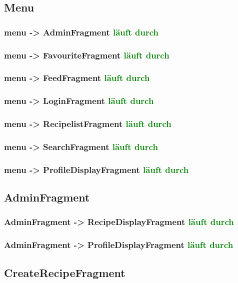 \subsection{Menu}
\subsubsection{menu -> AdminFragment \textcolor{green}{läuft durch}}
\subsubsection{menu -> FavouriteFragment \textcolor{green}{läuft durch}}
\subsubsection{menu -> FeedFragment \textcolor{green}{läuft durch}}
\subsubsection{menu -> LoginFragment \textcolor{green}{läuft durch}}
\subsubsection{menu -> RecipelistFragment \textcolor{green}{läuft durch}}
\subsubsection{menu -> SearchFragment \textcolor{green}{läuft durch}}
\subsubsection{menu -> ProfileDisplayFragment \textcolor{green}{läuft durch}}

\subsection{AdminFragment}
\subsubsection{AdminFragment -> RecipeDisplayFragment \textcolor{green}{läuft durch}}
\subsubsection{AdminFragment -> ProfileDisplayFragment \textcolor{green}{läuft durch}}

\subsection{CreateRecipeFragment}

